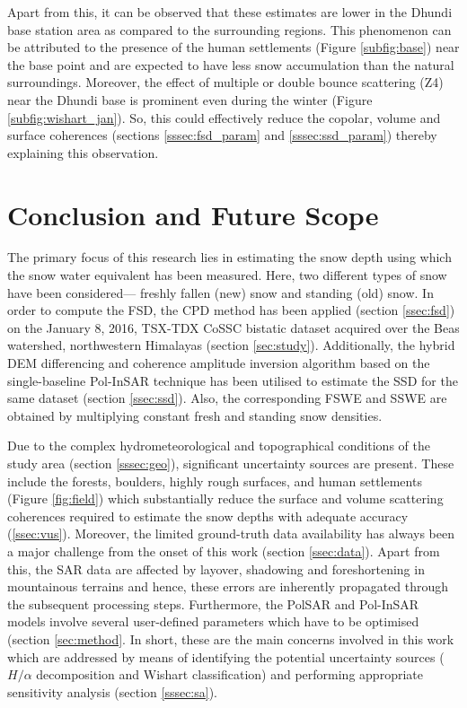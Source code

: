 \documentclass[review]{elsarticle}
\numberwithin{equation}{section}
\numberwithin{figure}{section}
\numberwithin{table}{section}
\begin{document}
Apart from this, it can be observed that these estimates are lower in the Dhundi base station area as compared to the surrounding regions. This phenomenon can be attributed to the presence of the human settlements (Figure \ref{subfig:base}) near the base point and are expected to have less snow accumulation than the natural surroundings. Moreover, the effect of multiple or double bounce scattering (Z4) near the Dhundi base is prominent even during the winter (Figure \ref{subfig:wishart_jan}). So, this could effectively reduce the copolar, volume and surface coherences (sections \ref{sssec:fsd_param} and \ref{sssec:ssd_param}) thereby explaining this observation.

\section{Conclusion and Future Scope}
\label{sec:conc}

The primary focus of this research lies in estimating the snow depth using which the snow water equivalent has been measured. Here, two different types of snow have been considered— freshly fallen (new) snow and standing (old) snow. In order to compute the FSD, the CPD method has been applied (section \ref{ssec:fsd}) on the January 8, 2016, TSX-TDX CoSSC bistatic dataset acquired over the Beas watershed, northwestern Himalayas (section \ref{sec:study}). Additionally, the hybrid DEM differencing and coherence amplitude inversion algorithm based on the single-baseline Pol-InSAR technique has been utilised to estimate the SSD for the same dataset (section \ref{ssec:ssd}). Also, the corresponding FSWE and SSWE are
obtained by multiplying constant fresh and standing snow densities.

Due to the complex hydrometeorological and topographical conditions of the study area (section \ref{sssec:geo}), significant uncertainty sources are present. These include the forests, boulders, highly rough surfaces, and human settlements (Figure \ref{fig:field}) which substantially reduce the surface and volume scattering coherences required to estimate the snow depths with adequate accuracy (\ref{ssec:vus}). Moreover, the limited ground-truth data availability has always been a major challenge from the onset of this work (section \ref{ssec:data}). Apart from this, the SAR data are affected by layover, shadowing and foreshortening in mountainous terrains and hence, these errors are inherently propagated through the subsequent processing steps. Furthermore, the PolSAR and Pol-InSAR models involve several user-defined parameters which have to be optimised (section \ref{sec:method}. In short, these are the main concerns involved in this work which are addressed by means of identifying the potential uncertainty sources ($H/{\alpha}$ decomposition and Wishart classification) and performing appropriate sensitivity analysis (section \ref{sssec:sa}).
\end{document}
